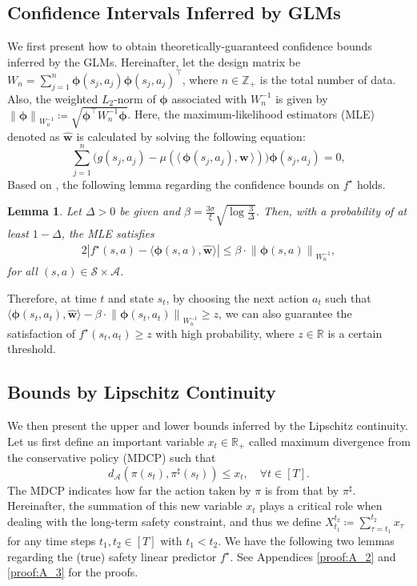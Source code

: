 \documentclass[letterpaper]{article} %
\newtheorem{lemma}
{Lemma}
\newcommand{\la}{\langle\,}
\newcommand{\ra}{\,\rangle}
\newcommand{\R}{\mathbb{R}}
\newcommand{\cA}{\mathcal{A}}
\newcommand{\cS}{\mathcal{S}}
\newcommand{\bphi}{\bm{\phi}}
\newcommand{\iprod}[2]{\langle #1, #2 \rangle}
\newcommand{\abs}[1]{\left|{#1}\right|}
\newcommand{\onlynorm}[1]{\left\|{#1}\right\|}
\begin{document}
\subsection{Confidence Intervals Inferred by GLMs}
\label{sec:bound_glm}

We first present how to obtain theoretically-guaranteed confidence bounds inferred by the GLMs.
Hereinafter, let the design matrix be
%
$W_n = \sum_{j=1}^n \bm{\phi}(s_j, a_j) \bm{\phi}(s_j, a_j)^\top$, where $n \in \mathbb{Z}_+$ is the total number of data.
%
Also, the weighted $L_2$-norm of $\bm{\phi}$ associated with $W_n^{-1}$ is given by
$\onlynorm{\bm{\phi}}_{W_n^{-1}} \coloneqq \sqrt{\bm{\phi}^\top W_n^{-1} \bm{\phi}}$.
%
Here, the maximum-likelihood estimators (MLE) denoted as $\hat{\bm{w}}$ is calculated by solving the following equation:
%
\begin{equation*}
    \sum_{j=1}^n \bigl(g(s_j, a_j) - \mu(\la \bphi(s_j, a_j), \bm{w} \ra) \bigr) \bphi(s_j, a_j) = 0,
\end{equation*}
%
Based on \citet{li2017provably}, the following lemma regarding the confidence bounds on $f^\star$ holds.
%
\begin{lemma}
\label{lemma:confidence_bound}
Let $\Delta > 0$ be given and $\beta = \frac{3 \sigma}{\xi} \sqrt{\log \frac{3}{\Delta}}$.
%
Then, with a probability of at least $1-\Delta$, the MLE satisfies
%
\begin{alignat*}{2}
\abs{f^\star(s,a) - \iprod{\bphi(s,a)}{\hat{\bm{w}}}} \le \beta \cdot \onlynorm{\bphi(s,a)}_{W_n^{-1}},
\end{alignat*}
%
for all $(s,a) \in \cS \times \cA$.
\end{lemma}
%
\noindent
Therefore, at time $t$ and state $s_t$, by choosing the next action $a_t$ such that $\iprod{\bphi(s_t, a_t)}{\hat{\bm{w}}} - \beta \cdot \onlynorm{\bphi(s_t, a_t)}_{W_n^{-1}} \ge z$, we can also guarantee the satisfaction of $f^\star(s_t, a_t) \ge z$ with high probability, where $z \in \R$ is a certain threshold.

\subsection{Bounds by Lipschitz Continuity}
\label{sec:bound_lipschiz}

We then present the upper and lower bounds inferred by the Lipschitz continuity.
Let us first define an important variable $x_t \in \R_+$ called maximum divergence from the conservative policy (MDCP) such that 
%
\begin{equation}
    \label{eq:policy_x_t}
    d_\cA(\pi(s_t), \pi^\sharp(s_t)) \le x_t, \quad \forall t \in [T].
\end{equation}
%
The MDCP indicates how far the action taken by $\pi$ is from that by $\pi^\sharp$.
Hereinafter, the summation of this new variable $x_t$ plays a critical role when dealing with the long-term safety constraint, and thus we define $X_{t_1}^{t_2} \coloneqq \sum_{\tau=t_1}^{t_2} x_\tau$ for any time steps $t_1, t_2 \in [T]$ with $t_1 < t_2$.
%
We have the following two lemmas regarding the (true) safety linear predictor $f^\star$.
See Appendices \ref{proof:A_2} and \ref{proof:A_3} for the proofs.
\end{document}
